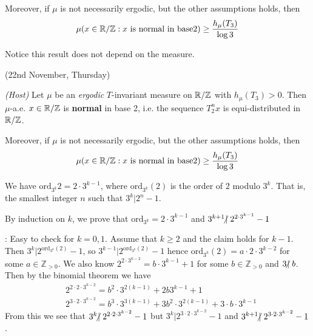 \documentclass[12pt,a4paper]{report}
\newenvironment{proof}
{\begin{changemargin}{1cm}{0.5cm} 
	}%
	{\end{changemargin}
}
\newenvironment{subproof}
{\begin{changemargin}{0.5cm}{0.5cm}
	}%
	{\end{changemargin}
}
\begin{document}
\quad Moreover, if $\mu$ is not necessarily ergodic, but the other assumptions holds, then
\begin{align*}
\mu (x\in \mathbb{R}/\mathbb{Z} : x \text{ is normal in base} 2) \geq \frac{h_{\mu}(T_3)}{\log 3}
\end{align*}

Notice this result does not depend on the measure.
\s

\newday

(22nd November, Thursday)
\s

\thm \emph{(Host)} Let $\mu$ be an \emph{ergodic} $T$-invariant measure on $\mathbb{R}/\mathbb{Z}$ with $h_{\mu}(T_3)>0$. Then $\mu$-a.e. $x\in \mathbb{R}/\mathbb{Z}$ is \textbf{normal} in base 2, i.e. the sequence $T_2^n x$ is equi-distributed in $\mathbb{R}/ \mathbb{Z}$.

\quad Moreover, if $\mu$ is not necessarily ergodic, but the other assumptions holds, then
\begin{align*}
\mu (x\in \mathbb{R}/\mathbb{Z} : x \text{ is normal in base} 2) \geq \frac{h_{\mu}(T_3)}{\log 3}
\end{align*}
\s

\lem We have $\text{ord}_{3^k}{2} = 2 \cdot 3^{k-1}$, where $\text{ord}_{3^k}(2)$ is the order of $2$ modulo $3^k$. That is, the smallest integer $n$ such that $3^k | 2^n -1$.
\begin{proof}
\pf By induction on $k$, we prove that $\text{ord}_{3^k} = 2\cdot 3^{k-1}$ and $3^{k+1} \hspace{-5pt}\not|\hspace{3pt} 2^{2\cdot 3^{k-1}} -1$
\begin{subproof}
: Easy to check for $k=0,1$. Assume that $k\geq 2$ and the claim holds for $k-1$. Then $3^k | 2^{\text{ord}_{3^k}(2)} -1$, so $3^{k-1} | 2^{\text{ord}_{3^k}(2)}-1$ hence $\text{ord}_{3^k}(2)=a\cdot 2\cdot 3^{k-2}$ for some $a\in \mathbb{Z}_{>0}$. We also know $2^{2\cdot 3^{k-2}} = b\cdot 3^{k-1} +1$ for some $b\in \mathbb{Z}_{>0}$ and $3\hspace{-5pt}\not|\hspace{3pt} b$. Then by the binomial theorem we have
\begin{align*}
& 2^{2\cdot 2\cdot 3^{k-2}} = b^2 \cdot 3^{2(k-1)} + 2b3^{k-1} +1 \\
& 2^{3\cdot 2\cdot 3^{k-2}} = b^3 \cdot 3^{3(k-1)} + 3b^2\cdot 3^{2(k-1)} + 3\cdot b\cdot 3^{k-1}
\end{align*}
From this we see that $3^k \hspace{-5pt}\not|\hspace{3pt} 2^{2\cdot 2 \cdot 3^{k-2}} -1$ but $3^k | 2^{3\cdot 2\cdot 3^{k-2}} -1$ and $3^{k+1} \hspace{-5pt}\not|\hspace{3pt} 2^{3\cdot 2\cdot 3^{k-2}} -1$.
\end{subproof}

\eop
\end{proof}
\s
\end{document}

